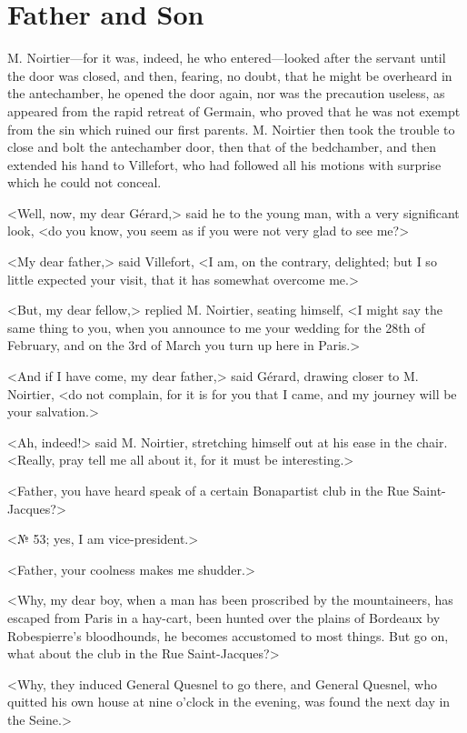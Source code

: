 \chapter{Father and Son} 
	
	\lettrine{M}{.} Noirtier—for it was, indeed, he who entered—looked after the servant until the door was closed, and then, fearing, no doubt, that he might be overheard in the antechamber, he opened the door again, nor was the precaution useless, as appeared from the rapid retreat of Germain, who proved that he was not exempt from the sin which ruined our first parents. M. Noirtier then took the trouble to close and bolt the antechamber door, then that of the bedchamber, and then extended his hand to Villefort, who had followed all his motions with surprise which he could not conceal. 

 <Well, now, my dear Gérard,> said he to the young man, with a very significant look, <do you know, you seem as if you were not very glad to see me?> 

 <My dear father,> said Villefort, <I am, on the contrary, delighted; but I so little expected your visit, that it has somewhat overcome me.> 

 <But, my dear fellow,> replied M. Noirtier, seating himself, <I might say the same thing to you, when you announce to me your wedding for the 28th of February, and on the 3rd of March you turn up here in Paris.> 

 <And if I have come, my dear father,> said Gérard, drawing closer to M. Noirtier, <do not complain, for it is for you that I came, and my journey will be your salvation.> 

 <Ah, indeed!> said M. Noirtier, stretching himself out at his ease in the chair. <Really, pray tell me all about it, for it must be interesting.> 

 <Father, you have heard speak of a certain Bonapartist club in the Rue Saint-Jacques?> 

 <№ 53; yes, I am vice-president.> 

 <Father, your coolness makes me shudder.> 

 <Why, my dear boy, when a man has been proscribed by the mountaineers, has escaped from Paris in a hay-cart, been hunted over the plains of Bordeaux by Robespierre's bloodhounds, he becomes accustomed to most things. But go on, what about the club in the Rue Saint-Jacques?> 

 <Why, they induced General Quesnel to go there, and General Quesnel, who quitted his own house at nine o'clock in the evening, was found the next day in the Seine.>

